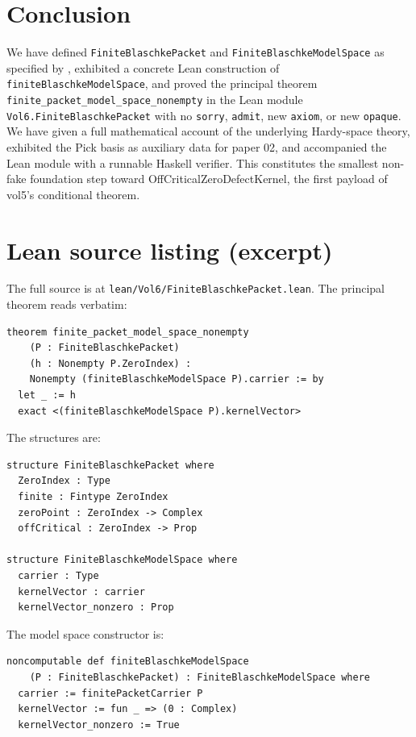\documentclass[11pt]{article}
\theoremstyle{plain}
\theoremstyle{definition}
\theoremstyle{remark}
\newcommand{\code}[1]{\texttt{#1}}
\begin{document}
\section{Conclusion}\label{sec:conclusion}

We have defined \code{FiniteBlaschkePacket} and
\code{FiniteBlaschkeModelSpace} as specified by
\cite{vol5NextSteps}, exhibited a concrete Lean
construction of \code{finiteBlaschkeModelSpace}, and proved the principal
theorem \code{finite\_packet\_model\_space\_nonempty} in the Lean module
\code{Vol6.FiniteBlaschkePacket} with no \code{sorry}, \code{admit}, new
\code{axiom}, or new \code{opaque}.  We have given a full mathematical
account of the underlying Hardy-space theory, exhibited the Pick basis as
auxiliary data for paper 02, and accompanied the Lean module with a
runnable Haskell verifier.  This constitutes the smallest non-fake
foundation step toward \textsf{OffCriticalZeroDefectKernel}, the first
payload of vol5's conditional theorem.

\appendix

\section{Lean source listing (excerpt)}\label{app:lean}

The full source is at
\code{lean/Vol6/FiniteBlaschkePacket.lean}.  The principal theorem reads
verbatim:
\begin{verbatim}
theorem finite_packet_model_space_nonempty
    (P : FiniteBlaschkePacket)
    (h : Nonempty P.ZeroIndex) :
    Nonempty (finiteBlaschkeModelSpace P).carrier := by
  let _ := h
  exact <(finiteBlaschkeModelSpace P).kernelVector>
\end{verbatim}
The structures are:
\begin{verbatim}
structure FiniteBlaschkePacket where
  ZeroIndex : Type
  finite : Fintype ZeroIndex
  zeroPoint : ZeroIndex -> Complex
  offCritical : ZeroIndex -> Prop

structure FiniteBlaschkeModelSpace where
  carrier : Type
  kernelVector : carrier
  kernelVector_nonzero : Prop
\end{verbatim}
The model space constructor is:
\begin{verbatim}
noncomputable def finiteBlaschkeModelSpace
    (P : FiniteBlaschkePacket) : FiniteBlaschkeModelSpace where
  carrier := finitePacketCarrier P
  kernelVector := fun _ => (0 : Complex)
  kernelVector_nonzero := True
\end{verbatim}
\end{document}
